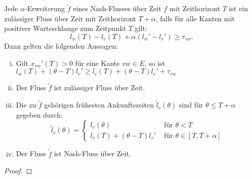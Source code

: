 \begin{lemma}
	Jede $\alpha$-Erweiterung $\tilde{f}$ eines Nash-Flusses über Zeit $f$ mit Zeithorizont $T$ ist ein zulässiger Fluss über Zeit mit Zeithorizont $T+\alpha$, falls für alle Kanten mit positiver Warteschlange zum Zeitpunkt $T$ gilt:
	$$l_w(T) - l_v(T) + \alpha(l_w' - l_v') \geq \tau_{vw}.$$
	Dann gelten die folgenden Aussagen:
	\begin{enumerate}[(i)]
		\item Gilt $x_{vw}'(T) > 0$ für eine Kante $vw\in E$, so ist $l_w(T) + (\theta - T)l_v' \geq l_v(T) + (\theta - T)l_v' + \tau_{vw}$
		\item Der Fluss $\tilde{f}$ ist zulässiger Fluss über Zeit.
		\item Die zu $\tilde{f}$ gehörigen frühesten Ankunftszeiten $\tilde{l}_v(\theta)$ sind für $\theta \leq T+\alpha$ gegeben durch:
		$$\tilde{l}_v(\theta) = \begin{cases}
		l_v(\theta) & \text{ für $\theta < T$} \\
		l_v(T) + (\theta - T) l_v' & \text{ für $\theta \in [T, T+\alpha]$}
		\end{cases}$$
		\item Der Fluss $\tilde{f}$ ist Nash-Fluss über Zeit.
	\end{enumerate}
\end{lemma}
\begin{proof}
	
\end{proof}